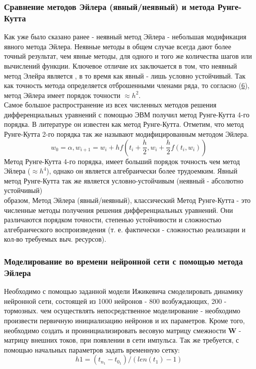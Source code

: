 \subsubsection{Сравнение методов Эйлера (явный/неявный) и метода Рунге-Кутта}
\hspace*{\parindent}Как уже было сказано ранее - неявный метод Эйлера - небольшая модификация явного метода Эйлера. Неявные методы в общем случае всегда дают более точный результат, чем явные методы, для одного и того же количества шагов или вычислений функции. Ключевое отличие их заключается в том, что неявный метод Элейра является , в то время как явный - лишь условно устойчивый. Так как точность метода определяется отброшенными членами ряда, то согласно (\hyperlink{res1}{6}), метод Эйлера имеет порядок точности $\approx  h^2$. \\
\indent Самое большое распространение из всех численных методов решения дифференциальных уравнений с помощью ЭВМ получил метод Рунге-Кутта 4-го порядка. В литературе он известен как метод Рунге-Кутта. Отметим, что метод Рунге-Кутта 2-го порядка так же называют модифицированным методом Эйлера.
\begin{equation}
    w_0 = \alpha, 
    w_{i+1} = w_i + hf(t_i + \frac{h}{2}, w_i+\frac{h}{2}f(t_i,w_i))
\end{equation}
\indent Метод Рунге-Кутта 4-го порядка, имеет больший порядок точность чем метод Эйлера ($\approx h^4$), однако он является алгебраически более трудоемким. Явный метод Рунге-Кутта так же является условно-устойчивым (неявный - абсолютно устойчивый)\\
 образом, Метод Эйлера (явный/неявный), классический Метод Рунге-Кутта - это численные методы получения решения дифференциальных уравнений. Они различаются порядком точности, степенью устойчивости и сложностью алгебраического воспроизведения (т. е. фактически - сложностью реализации и кол-во требуемых выч. ресурсов).
\subsubsection{Моделирование во времени нейронной сети с помощью метода Эйлера}
\hspace*{\parindent}Необходимо с помощью заданной модели Ижикевича смоделировать динамику нейронной сети, состоящей из 1000 нейронов - 800 возбуждающих, 200 - тормозных.
 чем осуществлять непосредственное моделирование - необходимо произвести первичную инициализацию нейронов и их параметров. Кроме того, необходимо создать и проинициализировать весовую матрицу смежности \textbf{W} - матрицу внешних токов, при появлении в сети импульса.
Так же требуется, с помощью начальных параметров задать временную сетку: \\
\begin{equation*}
    h1 = (t_n_1-t_0_1)/(len(t_1)-1)
\end{equation*}

